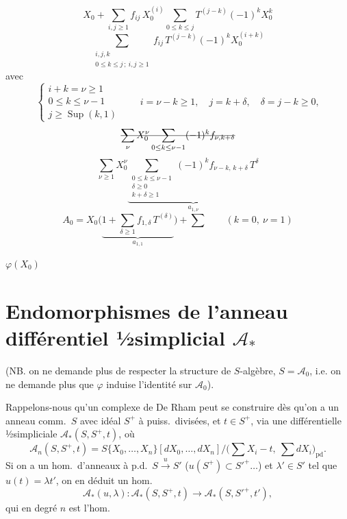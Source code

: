 \documentclass[11pt,a4paper]{article}
\begin{document}

\[
  X_0 + \sum_{i,j \geq 1} f_{ij}\, X_0^{(i)} \sum_{0 \leq k \leq j} T^{(j-k)} (-1)^k X_0^{k}
\]
\[
  \sum_{\substack{i,j,k \\ 0 \leq k \leq j\,;\ i,j \geq 1}} f_{ij}\, T^{(j-k)} (-1)^k X_0^{(i+k)}
\]
avec
\[
  \begin{cases}
    i + k = \nu \geq 1 \\
    0 \leq k \leq \nu - 1 \\
    j \geq \operatorname{Sup}(k,1)
  \end{cases}
  \qquad i = \nu - k \geq 1, \quad j = k + \delta, \quad \delta = j - k \geq 0 ,
\]
\[
  \text{\struck{$\displaystyle \sum_{\nu} X_0^{\nu} \sum_{0 \leq k \leq \nu-1} (-1)^k f_{\nu,k+\delta}$}}
\]
\[
  \sum_{\nu \geq 1} X_0^{\nu} \underbrace{\sum_{\substack{0 \leq k \leq \nu - 1 \\ \delta \geq 0 \\ k + \delta \geq 1}} (-1)^k f_{\nu-k,\,k+\delta}\, T^{\delta}}_{a_{1,\nu}}
\]
\[
  A_0 = X_0 \bigl( \underbrace{1 + \sum_{\delta \geq 1} f_{1,\delta}\, T^{(\delta)}}_{a_{1,1}} \bigr) + \sum
  \qquad (k = 0,\ \nu = 1)
\]

 $\varphi(X_0)$

\section{Endomorphismes de l'anneau différentiel ½simplicial $\mathcal{A}_*$}

(NB. on ne demande plus de respecter la structure de $S$-algèbre, $S = \mathcal{A}_0$, i.e. on ne demande plus que $\varphi$ induise l'identité sur $\mathcal{A}_0$).

Rappelons-nous qu'un complexe de De Rham peut se construire dès qu'on a un anneau comm.\ $S$ avec idéal $S^+$ à puiss.\ divisées, et $t \in S^+$, via une   différentielle  ½simpliciale $\mathcal{A}_*(S, S^+, t)$, où
\[
  \mathcal{A}_n(S, S^+, t) = S\{X_0, \ldots, X_n\}[dX_0, \ldots, dX_n] \big/ \bigl( \textstyle\sum X_i - t,\ \sum dX_i \bigr)_{\mathrm{pd}} .
\]
Si on a un hom.\ d'anneaux à p.d.\ $S \xrightarrow{u} S'$ ($u(S^+) \subset S'^+ \ldots$) et $\lambda' \in S'$  tel que $u(t) = \lambda t'$, on en déduit un hom.\ 
\[
  \mathcal{A}_*(u, \lambda) : \mathcal{A}_*(S, S^+, t) \longrightarrow \mathcal{A}_*(S, S'^+, t'),
\]
qui en degré $n$ est l'hom.
\end{document}
